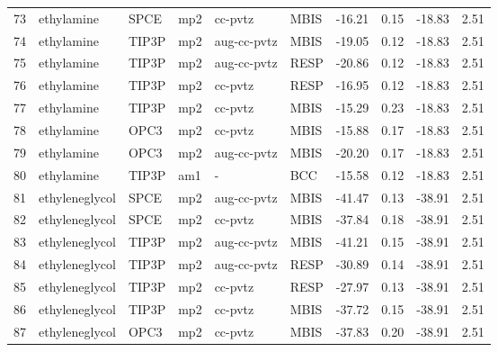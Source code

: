 \begin{tabular}{llllllrrrr}
73  &                     ethylamine &       SPCE &      mp2 &      cc-pvtz &         MBIS & -16.21 &      0.15 &      -18.83 &     2.51 \\
74  &                     ethylamine &      TIP3P &      mp2 &  aug-cc-pvtz &         MBIS & -19.05 &      0.12 &      -18.83 &     2.51 \\
75  &                     ethylamine &      TIP3P &      mp2 &  aug-cc-pvtz &         RESP & -20.86 &      0.12 &      -18.83 &     2.51 \\
76  &                     ethylamine &      TIP3P &      mp2 &      cc-pvtz &         RESP & -16.95 &      0.12 &      -18.83 &     2.51 \\
77  &                     ethylamine &      TIP3P &      mp2 &      cc-pvtz &         MBIS & -15.29 &      0.23 &      -18.83 &     2.51 \\
78  &                     ethylamine &       OPC3 &      mp2 &      cc-pvtz &         MBIS & -15.88 &      0.17 &      -18.83 &     2.51 \\
79  &                     ethylamine &       OPC3 &      mp2 &  aug-cc-pvtz &         MBIS & -20.20 &      0.17 &      -18.83 &     2.51 \\
80  &                     ethylamine &      TIP3P &      am1 &            - &          BCC & -15.58 &      0.12 &      -18.83 &     2.51 \\
81  &                 ethyleneglycol &       SPCE &      mp2 &  aug-cc-pvtz &         MBIS & -41.47 &      0.13 &      -38.91 &     2.51 \\
82  &                 ethyleneglycol &       SPCE &      mp2 &      cc-pvtz &         MBIS & -37.84 &      0.18 &      -38.91 &     2.51 \\
83  &                 ethyleneglycol &      TIP3P &      mp2 &  aug-cc-pvtz &         MBIS & -41.21 &      0.15 &      -38.91 &     2.51 \\
84  &                 ethyleneglycol &      TIP3P &      mp2 &  aug-cc-pvtz &         RESP & -30.89 &      0.14 &      -38.91 &     2.51 \\
85  &                 ethyleneglycol &      TIP3P &      mp2 &      cc-pvtz &         RESP & -27.97 &      0.13 &      -38.91 &     2.51 \\
86  &                 ethyleneglycol &      TIP3P &      mp2 &      cc-pvtz &         MBIS & -37.72 &      0.15 &      -38.91 &     2.51 \\
87  &                 ethyleneglycol &       OPC3 &      mp2 &      cc-pvtz &         MBIS & -37.83 &      0.20 &      -38.91 &     2.51 \\

\end{tabular}

